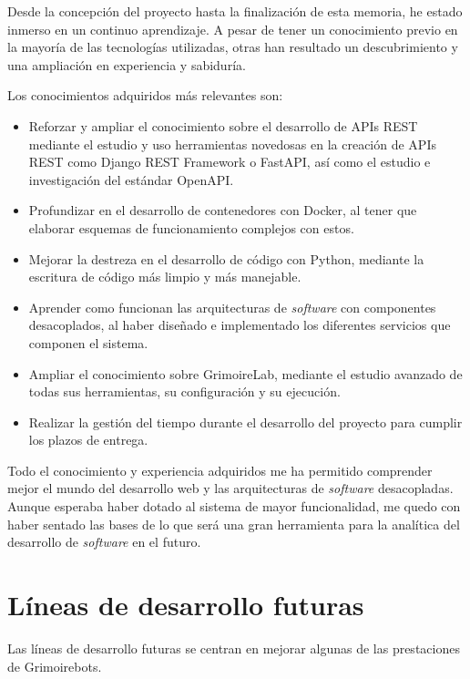 Desde la concepción del proyecto hasta la finalización de esta memoria, he estado inmerso en un continuo aprendizaje. A pesar de tener un conocimiento previo en la mayoría de las tecnologías utilizadas, otras han resultado un descubrimiento y una ampliación en experiencia y sabiduría.

Los conocimientos adquiridos más relevantes son:

\begin{itemize}
    \item Reforzar y ampliar el conocimiento sobre el desarrollo de APIs REST mediante el estudio y uso herramientas novedosas en la creación de APIs REST como Django REST Framework o FastAPI, así como el estudio e investigación del estándar OpenAPI.
    \item Profundizar en el desarrollo de contenedores con Docker, al tener que elaborar esquemas de funcionamiento complejos con estos.
    \item Mejorar la destreza en el desarrollo de código con Python, mediante la escritura de código más limpio y más manejable.
    \item Aprender como funcionan las arquitecturas de \emph{software} con componentes desacoplados, al haber diseñado e implementado los diferentes servicios que componen el sistema.
    \item Ampliar el conocimiento sobre GrimoireLab, mediante el estudio avanzado de todas sus herramientas, su configuración y su ejecución.
    \item Realizar la gestión del tiempo durante el desarrollo del proyecto para cumplir los plazos de entrega.
\end{itemize}

Todo el conocimiento y experiencia adquiridos me ha permitido comprender mejor el mundo del desarrollo web y las arquitecturas de \emph{software} desacopladas. Aunque esperaba haber dotado al sistema de mayor funcionalidad, me quedo con haber sentado las bases de lo que será una gran herramienta para la analítica del desarrollo de \emph{software} en el futuro.


\section{Líneas de desarrollo futuras}

Las líneas de desarrollo futuras se centran en mejorar algunas de las prestaciones de Grimoirebots.

